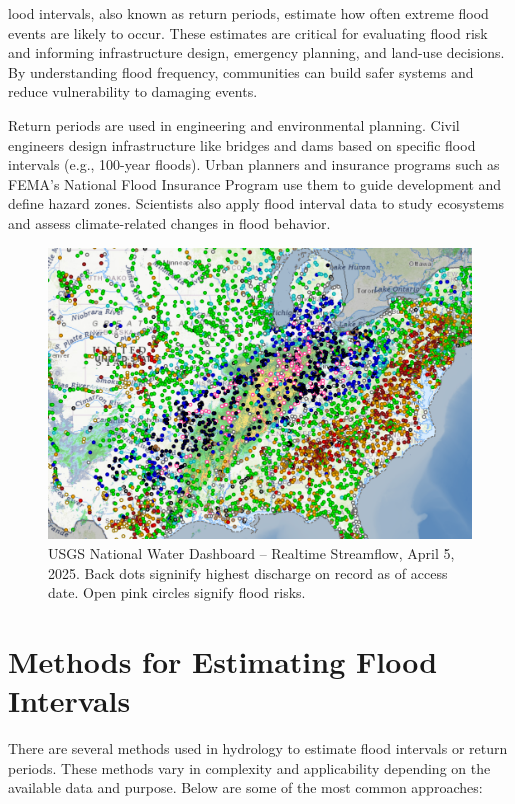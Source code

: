 \documentclass{tufte-handout}\usepackage[]{graphicx}\usepackage[]{xcolor}
\begin{document}
lood intervals, also known as return periods, estimate how often extreme flood events are likely to occur. These estimates are critical for evaluating flood risk and informing infrastructure design, emergency planning, and land-use decisions. By understanding flood frequency, communities can build safer systems and reduce vulnerability to damaging events.

Return periods are used in engineering and environmental planning. Civil engineers design infrastructure like bridges and dams based on specific flood intervals (e.g., 100-year floods). Urban planners and insurance programs such as FEMA's National Flood Insurance Program use them to guide development and define hazard zones. Scientists also apply flood interval data to study ecosystems and assess climate-related changes in flood behavior.

\begin{figure}
	\centering
		\includegraphics[width=1.00\textwidth]{figure/USGS_Discharge_20250405.png}
		\caption{USGS National Water Dashboard -- Realtime Streamflow, April 5, 2025. Back dots signinify highest discharge on record as of access date. Open pink circles signify flood risks.}
	\label{fig:USGS_Discharge_20250405}
\end{figure}


\section{Methods for Estimating Flood Intervals}

There are several methods used in hydrology to estimate flood intervals or return periods. These methods vary in complexity and applicability depending on the available data and purpose. Below are some of the most common approaches:
\end{document}
